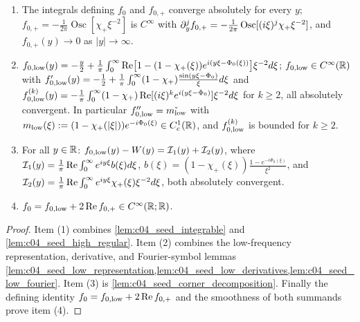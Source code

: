 \begin{lemma}
  \label{lem:c04_seed_decomposition}
  \begin{enumerate}
    \item The integrals defining $f_0$ and $f_{0,+}$ converge absolutely for every $y$; $f_{0,+}=-\frac1{2\pi}\operatorname{Osc}[\chi_+\xi^{-2}]$
      is $C^\infty$ with $\p_y^jf_{0,+}=-\frac1{2\pi}\operatorname{Osc}[(i\xi)^j\chi_+\xi^{-2}]$, and $f_{0,+}(y)\to0$ as $|y|\to\infty$.
    \item $f_{0,\textup{low}}(y)=-\frac y2+\frac1\pi\int_0^\infty\operatorname{Re}\bigl[1-(1-\chi_+(\xi))e^{i(y\xi-\Phi_0(\xi))}\bigr]\xi^{-2}d\xi$;
      $f_{0,\textup{low}}\in C^\infty(\R)$ with
      $f_{0,\textup{low}}'(y)=-\frac12+\frac1\pi\int_0^\infty(1-\chi_+)\frac{\sin(y\xi-\Phi_0)}{\xi}d\xi$ and
      $f_{0,\textup{low}}^{(k)}(y)=-\frac1\pi\int_0^\infty(1-\chi_+)\operatorname{Re}[(i\xi)^ke^{i(y\xi-\Phi_0)}]\xi^{-2}d\xi$ for $k\ge2$,
      all absolutely convergent. In particular $f_{0,\textup{low}}''=\widecheck{m_{\textup{low}}}$ with
      $m_{\textup{low}}(\xi):=(1-\chi_+(|\xi|))e^{-i\Phi_0(\xi)}\in C^1_c(\R)$, and $f_{0,\textup{low}}^{(k)}$ is bounded for $k\ge2$.
    \item For all $y\in\R$: $f_{0,\textup{low}}(y)-W(y)=\mc I_1(y)+\mc I_2(y)$, where
      $\mc I_1(y)=\frac1\pi\operatorname{Re}\int_0^\infty e^{iy\xi}b(\xi)d\xi$, $b(\xi)=(1-\chi_+(\xi))\frac{1-e^{-i\Phi_0(\xi)}}{\xi^2}$,
      and $\mc I_2(y)=\frac1\pi\operatorname{Re}\int_0^\infty e^{iy\xi}\chi_+(\xi)\xi^{-2}d\xi$, both absolutely convergent.
    \item $f_0=f_{0,\textup{low}}+2\operatorname{Re}f_{0,+}\in C^\infty(\R;\R)$.
  \end{enumerate}
\end{lemma}
\begin{proof}
  Item (1) combines \cref{lem:c04_seed_integrable} and \cref{lem:c04_seed_high_regular}.
  Item (2) combines the low-frequency representation, derivative, and Fourier-symbol
  lemmas \cref{lem:c04_seed_low_representation,lem:c04_seed_low_derivatives,lem:c04_seed_low_fourier}.
  Item (3) is \cref{lem:c04_seed_corner_decomposition}.
  Finally the defining identity $f_0=f_{0,\textup{low}}+2\operatorname{Re}f_{0,+}$
  and the smoothness of both summands prove item (4).
\end{proof}

